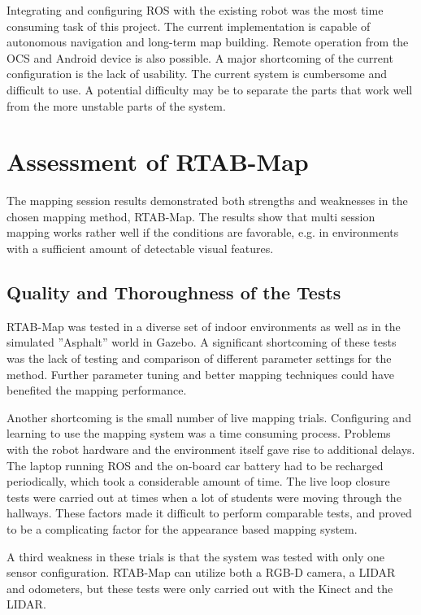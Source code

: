 Integrating and configuring \ac{ROS} with the existing robot was the most time consuming task of this project. The current implementation is capable of autonomous navigation and long-term map building. Remote operation from the \ac{OCS} and Android device is also possible. A major shortcoming of the current configuration is the lack of usability. The current system is 
cumbersome and difficult to use. A potential difficulty may be to separate the parts that work well from the more unstable parts of the system. 


\section{Assessment of RTAB-Map}

The mapping session results demonstrated both strengths and weaknesses  in the chosen mapping method, \ac{RTAB-Map}. The results show that multi session mapping works rather well if the conditions are favorable, e.g. in environments with a sufficient amount of detectable visual features. 

\subsection{Quality and Thoroughness of the Tests}
\label{sec:test_quality}
\ac{RTAB-Map} was tested in a diverse set of indoor environments as well as in the simulated ''Asphalt'' world in Gazebo. A significant shortcoming of these tests was the lack of testing and comparison of different parameter settings for the method. Further parameter tuning and better mapping techniques could have benefited the mapping performance.

Another shortcoming is the small number of live mapping trials. Configuring and learning to use the mapping system was a time consuming process. Problems with the robot hardware and the environment itself gave rise to additional delays. The laptop running \ac{ROS} and the on-board car battery had to be recharged periodically, which took a considerable amount of time. The live loop closure tests were carried out at times when a lot of students were moving through the hallways. These factors made it difficult to perform comparable tests, and proved to be a complicating factor for the appearance based mapping system. 

A third weakness in these trials is that the system was tested with only one sensor configuration. \ac{RTAB-Map} can utilize both a RGB-D camera, a LIDAR and odometers, but these tests were only carried out with the Kinect and the LIDAR.

